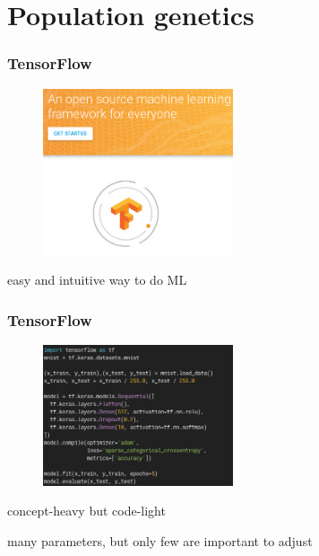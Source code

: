 
\section{Population genetics}

\begin{frame}
        \frametitle{TensorFlow}

        \begin{figure}
        	\includegraphics[width=0.5\textwidth]{Pics/tensorflow.png}
        \end{figure}

	easy and intuitive way to do ML

\end{frame}

\begin{frame}
        \frametitle{TensorFlow}

        \begin{figure}
                \includegraphics[width=0.5\textwidth]{Pics/tf_code.png}
        \end{figure}

	concept-heavy but code-light

	many parameters, but only few are important to adjust

\end{frame}

